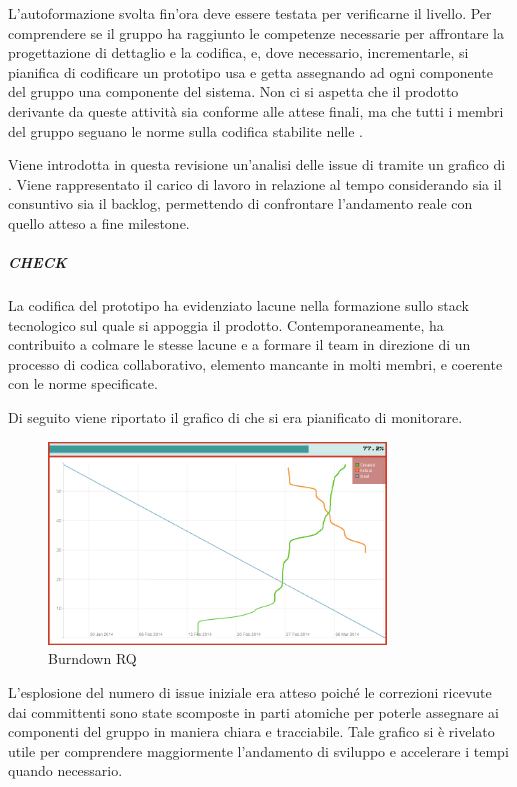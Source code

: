 	L'autoformazione svolta fin'ora deve essere testata per verificarne il livello. Per comprendere se il gruppo ha raggiunto le competenze necessarie per affrontare la progettazione di dettaglio e la codifica, e, dove necessario, incrementarle, si pianifica di codificare un prototipo usa e getta assegnando ad ogni componente del gruppo una componente del sistema. Non ci si aspetta che il prodotto derivante da queste attività sia conforme alle attese finali, ma che tutti i membri del gruppo seguano le norme sulla codifica stabilite nelle \NormeDiProgetto{}.
	
	Viene introdotta in questa revisione un'analisi delle issue di  tramite un grafico di . Viene rappresentato il carico di lavoro in relazione al tempo considerando sia il consuntivo sia il backlog, permettendo di confrontare l'andamento reale con quello atteso a fine milestone.
	
	\subparagraph{CHECK}
	La codifica del prototipo ha evidenziato lacune nella formazione sullo stack tecnologico sul quale si appoggia il prodotto. Contemporaneamente, ha contribuito a colmare le stesse lacune e a formare il team in direzione di un processo di codica collaborativo, elemento mancante in molti membri, e coerente con le norme specificate.

	Di seguito viene riportato il grafico di  che si era pianificato di monitorare.
	
	\begin{figure}[H]
		\centering \includegraphics[width=0.8\textwidth]{burndownRQ.png}
		\caption{Burndown RQ}
	\end{figure}
	
	L'esplosione del numero di issue iniziale era atteso poiché le correzioni ricevute dai committenti sono state scomposte in parti atomiche per poterle assegnare ai componenti del gruppo in maniera chiara e tracciabile. Tale grafico si è rivelato utile per comprendere maggiormente l'andamento di sviluppo e accelerare i tempi quando necessario.